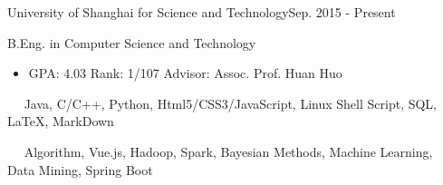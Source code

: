 \documentclass{sorahjy_cv}
\begin{document}
\pagestyle{empty}


\begin{cvHeader}
\end{cvHeader}

%
%

\begin{sectionContentSimple}{University of Shanghai for Science and Technology}{Sep. 2015 - Present}
	\item B.Eng. in Computer Science and Technology
	\begin{itemize}
		\item GPA: 4.03 \quad Rank: 1/107 \quad Advisor: Assoc. Prof. Huan Huo
	\end{itemize}
	
\end{sectionContentSimple}

%
%






%
%

\begin{description}{}
	\item{\ \ } Java, C/C++, Python, Html5/CSS3/JavaScript, Linux Shell Script, SQL, \LaTeX, MarkDown
	\item{\ \ } Algorithm, Vue.js, Hadoop, Spark, Bayesian Methods, Machine Learning, Data Mining, Spring Boot
\end{description}
\end{document}
